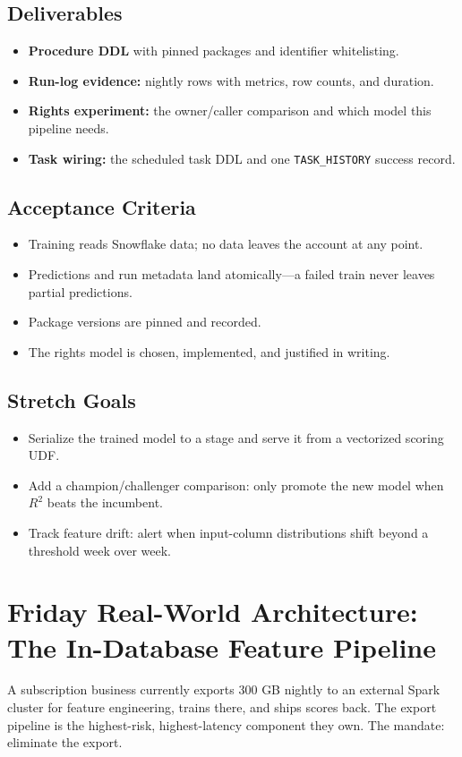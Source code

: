 \subsection*{Deliverables}
\begin{itemize}
    \item \textbf{Procedure DDL} with pinned packages and identifier whitelisting.
    \item \textbf{Run-log evidence:} nightly rows with metrics, row counts, and duration.
    \item \textbf{Rights experiment:} the owner/caller comparison and which model this pipeline needs.
    \item \textbf{Task wiring:} the scheduled task DDL and one \texttt{TASK\_HISTORY} success record.
\end{itemize}

\subsection*{Acceptance Criteria}
\begin{itemize}
    \item Training reads Snowflake data; no data leaves the account at any point.
    \item Predictions and run metadata land atomically---a failed train never leaves partial predictions.
    \item Package versions are pinned and recorded.
    \item The rights model is chosen, implemented, and justified in writing.
\end{itemize}

\subsection*{Stretch Goals}
\begin{itemize}
    \item Serialize the trained model to a stage and serve it from a vectorized scoring UDF.
    \item Add a champion/challenger comparison: only promote the new model when $R^2$ beats the incumbent.
    \item Track feature drift: alert when input-column distributions shift beyond a threshold week over week.
\end{itemize}

\section{Friday Real-World Architecture: The In-Database Feature Pipeline}
A subscription business currently exports 300 GB nightly to an external Spark cluster for feature engineering, trains there, and ships scores back. The export pipeline is the highest-risk, highest-latency component they own. The mandate: eliminate the export.

